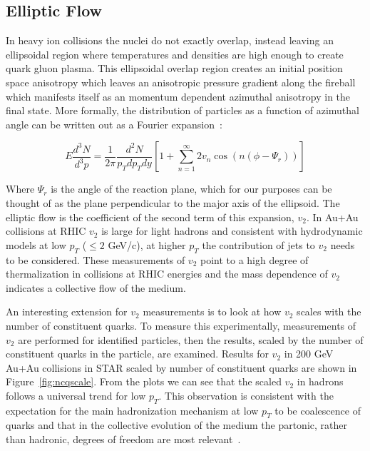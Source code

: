 \subsection{Elliptic Flow}

In heavy ion collisions the nuclei do not exactly overlap, instead leaving an ellipsoidal region where temperatures and densities are high enough to create quark gluon plasma. This ellipsoidal overlap region creates an initial position space anisotropy which leaves an anisotropic pressure gradient along the fireball which manifests itself as an momentum dependent azimuthal anisotropy in the final state. More formally, the distribution of particles as a function of azimuthal angle can be written out as a Fourier expansion~\cite{v2long}:

\begin{equation}\label{eq:v2def}
E\frac{d^3N}{d^3p} = \frac{1}{2\pi}\frac{d^2N}{p_Tdp_Tdy}[1 + \sum_{n=1}^{\infty}2 v_n \cos(n(\phi - \Psi_r))]
\end{equation}

Where $\Psi_r$ is the angle of the reaction plane, which for our purposes can be thought of as the plane perpendicular to the major axis of the ellipsoid. The elliptic flow is the coefficient of the second term of this expansion, $v_2$. In Au+Au collisions at RHIC $v_2$ is large for light hadrons and consistent with hydrodynamic models at low $p_T$ ($\leq 2$ GeV/c), at higher $p_T$ the contribution of jets to $v_2$ needs to be considered. These measurements of $v_2$ point to a high degree of thermalization in collisions at RHIC energies and the mass dependence of $v_2$ indicates a collective flow of the medium.

An interesting extension for $v_2$ measurements is to look at how $v_2$ scales with the number of constituent quarks. To measure this experimentally, measurements of $v_2$ are performed for identified particles, then the results, scaled by the number of constituent quarks in the particle, are examined. Results for $v_2$ in 200 GeV Au+Au collisions in STAR scaled by number of constituent quarks are shown in Figure~\ref{fig:ncqscale}. From the plots we can see that the scaled $v_2$ in hadrons follows a universal trend for low $p_T$. This observation is consistent with the expectation for the main hadronization mechanism at low $p_T$ to be coalescence of quarks and that in the collective evolution of the medium the partonic, rather than hadronic, degrees of freedom are most relevant~\cite{ncqscale}. 

